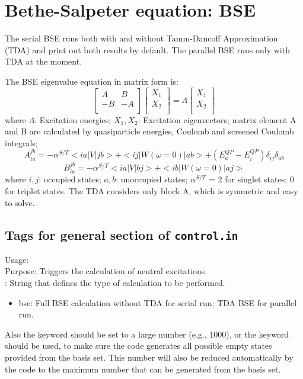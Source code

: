 \section{Bethe-Salpeter equation: BSE}\label{Sec:BSE}
The serial BSE runs both with and without Tamm-Dancoff Approximation (TDA) and print out both results by default. The parallel BSE runs only with TDA at the moment.

The BSE eigenvalue equation in matrix form is:
        $$\begin{bmatrix}
          A       & B \\
          -B       & -A \\
        \end{bmatrix}
        \begin{bmatrix}
          X_1 \\
          X_2 \\
        \end{bmatrix} = 
        \Lambda
        \begin{bmatrix}
          X_1 \\
          X_2 \\
        \end{bmatrix}$$
where $\Lambda$: Excitation energies; $X_1, X_2$: Excitation eigenvectors;
matrix element A and B are calculated by quasiparticle energies, Coulomb and screened Coulomb integrals; $$A_{ia}^{jb} = -\alpha^{S/T}<ia|V|jb>+<ij|W(\omega = 0)|ab> + (E_a^{QP} - E_i^{QP})\delta_{ij}\delta_{ab}$$
$$B_{ia}^{jb}=-\alpha^{S/T}<ia|V|bj>+<ib|W(\omega = 0)|aj>$$
where $i, j$: occupied states; $a, b$: unoccupied states; $\alpha^{S/T}$ = 2 for singlet states; 0 for triplet states. The TDA considers only block A, which is symmetric and easy to solve.
\subsection*{Tags for general section of \texttt{control.in}}

 {
\noindent
Usage:  \\
Purpose: Triggers the calculation of neutral excitations.\\
: String that defines the type of calculation to be performed.
\begin{itemize}
\item bse: Full BSE calculation without TDA for serial run; TDA BSE for parallel run.
\end{itemize}
}
Also the keyword  should be set to a large number (e.g., 1000), or the keyword  should be used, to make sure the code generates all
possible empty states provided from the basis set. This number will also be reduced automatically by the code to the maximum number that can be generated from the basis set.

